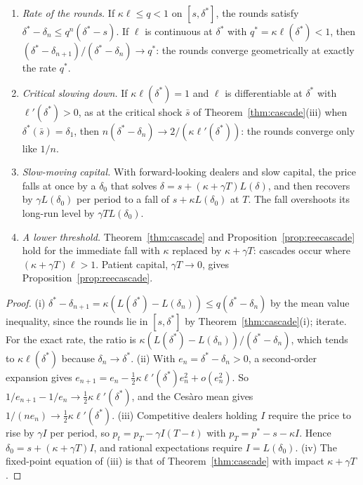 \begin{proposition}\label{prop:cascadedyn}
\begin{enumerate}[label=(\roman*),itemsep=1pt]
\item \emph{Rate of the rounds.} If $\kappa\ell\le q<1$ on $[s,\delta^*]$, the rounds satisfy $\delta^*-\delta_n\le q^n(\delta^*-s)$. If $\ell$ is continuous at $\delta^*$ with $q^*=\kappa\ell(\delta^*)<1$, then $(\delta^*-\delta_{n+1})/(\delta^*-\delta_n)\to q^*$: the rounds converge geometrically at exactly the rate $q^*$.
\item \emph{Critical slowing down.} If $\kappa\ell(\delta^*)=1$ and $\ell$ is differentiable at $\delta^*$ with $\ell'(\delta^*)>0$, as at the critical shock $\bar s$ of Theorem~\ref{thm:cascade}(iii) when $\delta^*(\bar s)=\delta_1$, then $n(\delta^*-\delta_n)\to2/(\kappa\ell'(\delta^*))$: the rounds converge only like $1/n$.
\item \emph{Slow-moving capital.} With forward-looking dealers and slow capital, the price falls at once by a $\delta_0$ that solves $\delta=s+(\kappa+\gamma T)L(\delta)$, and then recovers by $\gamma L(\delta_0)$ per period to a fall of $s+\kappa L(\delta_0)$ at $T$. The fall overshoots its long-run level by $\gamma TL(\delta_0)$.
\item \emph{A lower threshold.} Theorem~\ref{thm:cascade} and Proposition~\ref{prop:reecascade} hold for the immediate fall with $\kappa$ replaced by $\kappa+\gamma T$: cascades occur where $(\kappa+\gamma T)\ell>1$. Patient capital, $\gamma T\to0$, gives Proposition~\ref{prop:reecascade}.
\end{enumerate}
\end{proposition}

\begin{proof}
(i) $\delta^*-\delta_{n+1}=\kappa(L(\delta^*)-L(\delta_n))\le q(\delta^*-\delta_n)$ by the mean value inequality, since the rounds lie in $[s,\delta^*]$ by Theorem~\ref{thm:cascade}(i); iterate. For the exact rate, the ratio is $\kappa(L(\delta^*)-L(\delta_n))/(\delta^*-\delta_n)$, which tends to $\kappa\ell(\delta^*)$ because $\delta_n\to\delta^*$. (ii) With $e_n=\delta^*-\delta_n>0$, a second-order expansion gives $e_{n+1}=e_n-\frac12\kappa\ell'(\delta^*)e_n^2+o(e_n^2)$. So $1/e_{n+1}-1/e_n\to\frac12\kappa\ell'(\delta^*)$, and the Ces\`aro mean gives $1/(ne_n)\to\frac12\kappa\ell'(\delta^*)$. (iii) Competitive dealers holding $I$ require the price to rise by $\gamma I$ per period, so $p_t=p_T-\gamma I(T-t)$ with $p_T=p^*-s-\kappa I$. Hence $\delta_0=s+(\kappa+\gamma T)I$, and rational expectations require $I=L(\delta_0)$. (iv) The fixed-point equation of (iii) is that of Theorem~\ref{thm:cascade} with impact $\kappa+\gamma T$.
\end{proof}

